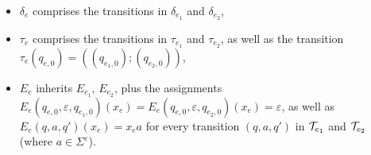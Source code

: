 \begin{itemize}
			\item $\delta_e$ comprises the transitions in $\delta_{e_1}$ and $\delta_{e_2}$,
			\item $\tau_e$ comprises the transitions in $\tau_{e_1}$ and $\tau_{e_2}$, as well as the transition $\tau_e(q_{e,0}) = ((q_{e_1,0}); (q_{e_2,0}))$,
			\item $E_e$ inherits $E_{e_1}$, $E_{e_2}$, plus the assignments $E_e(q_{e,0}, \varepsilon, q_{e_1,0})(x_{e}) = E_e(q_{e,0}, \varepsilon, q_{e_2,0})(x_{e}) =\varepsilon$, as well as $E_e(q,a, q')(x_{e}) = x_e a$ for every transition $(q, a, q')$ in $\mathcal{T}_{e_1}$ and $\mathcal{T}_{e_2}$ (where $a \in \Sigma^\varepsilon$).
\end{itemize}
